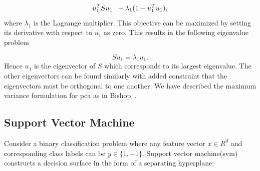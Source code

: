\begin{equation}\label{eq_pca3}
u_1^TSu_1 \hspace{.2cm} + \lambda_1(1-u_1^Tu_1),
\end{equation}
where $\lambda_1$ is the Lagrange multiplier. This objective can be maximized by setting its derivative with respect to $u_1$ as zero. This results in the following eigenvalue problem

\begin{equation}\label{eq_pca4}
Su_1 = \lambda_1 u_1.
\end{equation}
Hence $u_1$ is the eigenvector of $S$ which corresponds to its largest eigenvalue. The other eigenvectors can be found similarly with added constraint that the eigenvectors must be orthogonal to one another. We have described the maximum variance formulation for {\sc pca} as in Bishop~\cite{prml}.

\subsection{Support Vector Machine}
\label{subsec_svm}

Consider a binary classification problem where any feature vector $x \in R^d$ and corresponding class labels can be $y \in \{1, -1 \}$. Support vector machine({\sc svm}) constructs a decision surface in the form of a separating hyperplane: 

